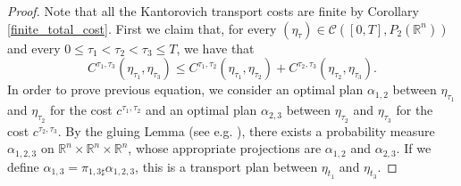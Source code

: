 \documentclass[reqno]{amsart}
\theoremstyle{plain}
\theoremstyle{definition}
\theoremstyle{remark}
\begin{document}
\begin{proof}
		Note that all the Kantorovich transport costs are finite by Corollary \ref{finite_total_cost}.
			First we claim that, for every $(\eta_\tau)\in \mathcal{C}([0,T],P_2(\mathbb{R}^n))$ and every $0\leq \tau_1 < \tau_2 < \tau_3\leq T$, we have that
			\begin{equation}\label{monotonicity_refining_costs}
				C^{\tau_1,\tau_3}(\eta_{\tau_1},\eta_{\tau_3})\leq C^{\tau_1,\tau_2}(\eta_{\tau_1},\eta_{\tau_2})+C^{\tau_2,\tau_3}(\eta_{\tau_2},\eta_{\tau_3}).
			\end{equation}
			In order to prove previous equation, we consider an optimal plan $\alpha_{1,2}$ between $\eta_{\tau_1}$ and $\eta_{\tau_2}$ for the cost $c^{\tau_1,\tau_2}$ and an optimal plan $\alpha_{2,3}$ between $\eta_{\tau_2}$ and $\eta_{\tau_3}$ for the cost $c^{\tau_2,\tau_3}$. By the gluing Lemma (see e.g. \cite[Lemma 3.1]{Usersguide}), there exists a probability measure $\alpha_{1,2,3}$ on $\mathbb{R}^n\times\mathbb{R}^n\times\mathbb{R}^n$, whose appropriate projections are $\alpha_{1,2}$ and $\alpha_{2,3}$. If we define $\alpha_{1,3}=\pi_{1,3\sharp}\alpha_{1,2,3}$, this is a transport plan between $\eta_{t_1}$ and $\eta_{t_3}$.
            

\end{proof}
\end{document}
